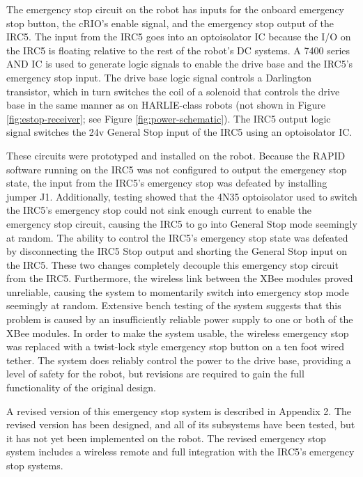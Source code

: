 \documentclass[]{cwru} %
\begin{document}
The emergency stop circuit on the robot has inputs for the onboard
emergency stop button, the cRIO's enable signal, and the emergency stop
output of the IRC5. The input from the IRC5 goes into an optoisolator IC
because the I/O on the IRC5 is floating relative to the rest of the
robot's DC systems. A 7400 series AND IC is used to generate logic
signals to enable the drive base and the IRC5's emergency stop input.
The drive base logic signal controls a Darlington transistor, which in
turn switches the coil of a solenoid that controls the drive base in the
same manner as on HARLIE-class robots (not shown in Figure 
\ref{fig:estop-receiver}; see Figure \ref{fig:power-schematic}). The IRC5 
output logic signal switches the 24v General Stop input of the IRC5 using 
an optoisolator IC.

These circuits were prototyped and installed on the robot. Because the
RAPID software running on the IRC5 was not configured to output the
emergency stop state, the input from the IRC5's emergency stop was
defeated by installing jumper J1. Additionally, testing showed that the
4N35 optoisolator used to switch the IRC5's emergency stop could not
sink enough current to enable the emergency stop circuit, causing the
IRC5 to go into General Stop mode seemingly at random. The ability to
control the IRC5's emergency stop state was defeated by disconnecting
the IRC5 Stop output and shorting the General Stop input on the IRC5.
These two changes completely decouple this emergency stop circuit from
the IRC5. Furthermore, the wireless link between the XBee modules proved
unreliable, causing the system to momentarily switch into emergency stop
mode seemingly at random. Extensive bench testing of the system suggests
that this problem is caused by an insufficiently reliable power supply
to one or both of the XBee modules. In order to make the system usable,
the wireless emergency stop was replaced with a twist-lock style
emergency stop button on a ten foot wired tether. The system does
reliably control the power to the drive base, providing a level of
safety for the robot, but revisions are required to gain the full
functionality of the original design.

A revised version of this emergency stop system is described in Appendix
2. The revised version has been designed, and all of its subsystems have
been tested, but it has not yet been implemented on the robot. The
revised emergency stop system includes a wireless remote and full
integration with the IRC5's emergency stop systems.
\end{document}
